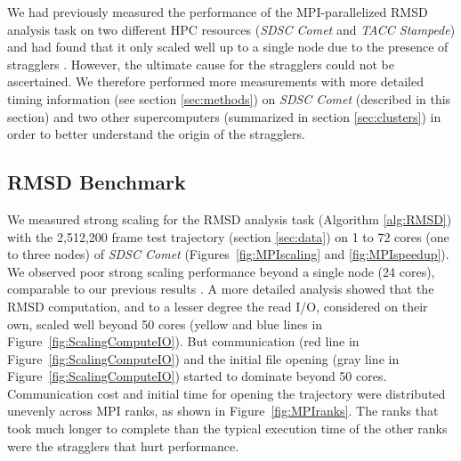 \label{sec:experiments}

We had previously measured the performance of the MPI-parallelized RMSD analysis task on two different HPC resources (\emph{SDSC Comet} and \emph{TACC Stampede}) and had found that it only scaled well up to a single node due to the presence of stragglers \cite{Khoshlessan:2017ab}.
However, the ultimate cause for the stragglers could not be ascertained.
We therefore performed more measurements with more detailed timing information (see section \ref{sec:methods}) on \emph{SDSC Comet} (described in this section) and two other supercomputers (summarized in section \ref{sec:clusters}) in order to better understand the origin of the stragglers. 

\subsection{RMSD Benchmark}
\label{sec:RMSD}

We measured strong scaling for the RMSD analysis task (Algorithm \ref{alg:RMSD}) with the 2,512,200 frame test trajectory (section \ref{sec:data}) on 1 to 72 cores (one to three nodes) of \emph{SDSC Comet} (Figures~\ref{fig:MPIscaling} and \ref{fig:MPIspeedup}). 
We observed poor strong scaling performance beyond a single node (24 cores), comparable to our previous results \cite{Khoshlessan:2017ab}.
A more detailed analysis showed that the RMSD computation, and to a lesser degree the read I/O, considered on their own, scaled well beyond 50 cores (yellow and blue lines in Figure~\ref{fig:ScalingComputeIO}). 
But communication (red line in Figure~\ref{fig:ScalingComputeIO}) and the initial file opening (gray line in Figure~\ref{fig:ScalingComputeIO}) started to dominate beyond 50 cores.
Communication cost and initial time for opening the trajectory were distributed unevenly across MPI ranks, as shown in Figure~\ref{fig:MPIranks}. 
The ranks that took much longer to complete than the typical execution time of the other ranks were the stragglers that hurt performance.

